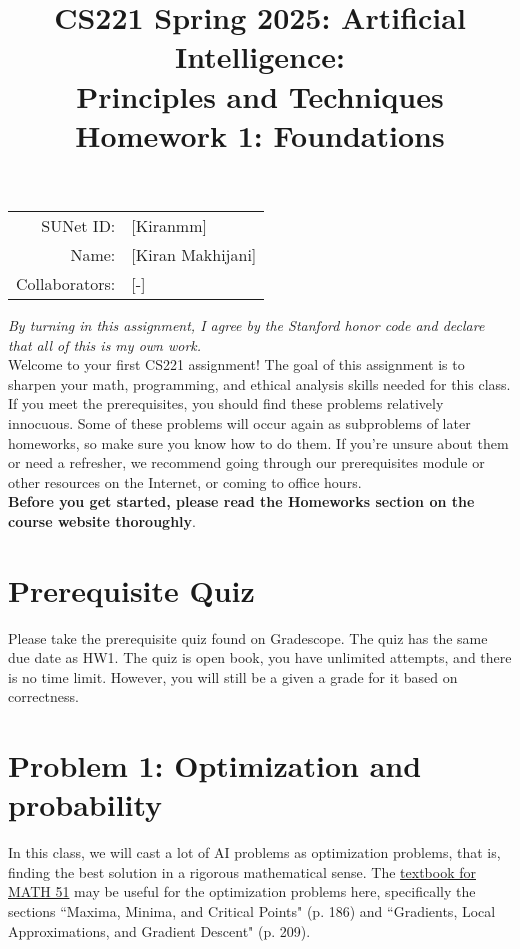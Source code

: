 \documentclass{article}
\title{\textbf{CS221 Spring 2025: Artificial Intelligence:\\ Principles and Techniques} \\Homework 1: Foundations}
\date{}
\theoremstyle{case}
\theoremstyle{definition}
\begin{document}
\maketitle

\begin{center}
\begin{tabular}{rl}
SUNet ID: & [Kiranmm] \\
Name: & [Kiran Makhijani] \\
Collaborators: & [-]
\end{tabular}
\end{center}

\textit{By turning in this assignment, I agree by the Stanford honor code and declare
that all of this is my own work.} \\

Welcome to your first CS221 assignment! The goal of this assignment is to sharpen your math, programming, and ethical analysis skills needed for this class. If you meet the prerequisites, you should find these problems relatively innocuous. Some of these problems will occur again as subproblems of later homeworks, so make sure you know how to do them. If you're unsure about them or need a refresher, we recommend going through our prerequisites module or other resources on the Internet, or coming to office hours.\\

\textbf{Before you get started, please read the Homeworks section on the course website thoroughly}.

\section*{Prerequisite Quiz}

Please take the prerequisite quiz found on Gradescope. The quiz has the same due date as HW1. The quiz is open book, you have unlimited attempts, and there is no time limit. However, you will still be a given a grade for it based on correctness.

\section*{Problem 1: Optimization and probability}

In this class, we will cast a lot of AI problems as optimization problems, that is, finding the best solution in a rigorous mathematical sense. The \href{https://web.stanford.edu/class/math51/stanford/math51book.pdf}{textbook for MATH 51} may be useful for the optimization problems here, specifically the sections ``Maxima, Minima, and Critical Points" (p. 186) and ``Gradients, Local Approximations, and Gradient Descent" (p. 209). \\
\end{document}
